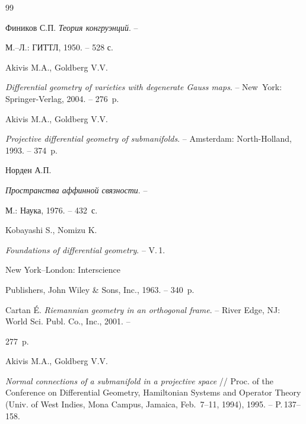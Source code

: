 \begin{thebibliography}{99}







Фиников С.П. {\em Теория конгруэнций}. --


М.--Л.: ГИТТЛ,  1950. -- 528 с.







Akivis M.A., Goldberg V.V.


{\em Differential geometry of varieties with degenerate Gauss
maps}. -- New~York: Springer-Verlag, 2004. -- 276~p.



 Akivis M.A., Goldberg V.V.


{\em Projective differential geometry of submanifolds}. --
Amsterdam: North-Holland, 1993. -- 374~p.





 Норден А.П.


{\it Пространства аффинной связности}. --


М.: Наука, 1976. -- 432~с.







Kobayashi S., Nomizu K.


{\it Foundations of differential geometry}. -- V.\,1. 


New York--London: Interscience


Publishers, John Wiley \& Sons, Inc., 1963. -- 340~p.







Cartan \'{E}. {\em  Riemannian geometry in an orthogonal
frame}. -- River Edge, NJ: World Sci. Publ. Co., Inc., 2001. --


277~p.







Akivis M.A., Goldberg V.V.


{\it Normal connections of a submanifold in a projective
space} // Proc. of the Conference on Differential Geometry,
Hamiltonian Systems and Operator Theory (Univ. of West
Indies, Mona Campus, Jamaica, Feb.~7--11, 1994), 1995. --
P.\,137--158.




\end{thebibliography}
